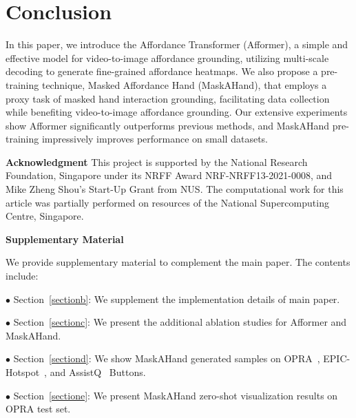 \documentclass[10pt,twocolumn,letterpaper]{article}
\begin{document}
\section{Conclusion}
In this paper, we introduce the Affordance Transformer (Afformer), a simple and effective model for video-to-image affordance grounding, utilizing multi-scale decoding to generate fine-grained affordance heatmaps. We also propose a pre-training technique, Masked Affordance Hand (MaskAHand), that employs a proxy task of masked hand interaction grounding, facilitating data collection while benefiting video-to-image affordance grounding. Our extensive experiments show Afformer significantly outperforms previous methods, and MaskAHand pre-training impressively improves performance on small datasets.

\vspace{2mm}
\noindent\textbf{\large{Acknowledgment}} \quad
This project is supported by the National Research Foundation, Singapore under its NRFF Award NRF-NRFF13-2021-0008, and Mike Zheng Shou’s Start-Up Grant from NUS. The computational work for this article was partially performed on resources of the National Supercomputing Centre, Singapore.

{\small


}

\clearpage

\noindent\large{\textbf{Supplementary Material}}
\vspace{1mm}

We provide supplementary material to complement the main paper. The contents include:

$\bullet$ Section~\ref{sectionb}: We supplement the implementation details of main paper. 

$\bullet$ Section~\ref{sectionc}: We present the additional ablation studies for Afformer and MaskAHand.

$\bullet$ Section~\ref{sectiond}: We show MaskAHand generated samples on OPRA~\cite{demo2vec}, EPIC-Hotspot~\cite{hotspot}, and AssistQ~\cite{assistq} Buttons.

$\bullet$ Section~\ref{sectione}: We present MaskAHand zero-shot visualization results on OPRA test set.
\end{document}
